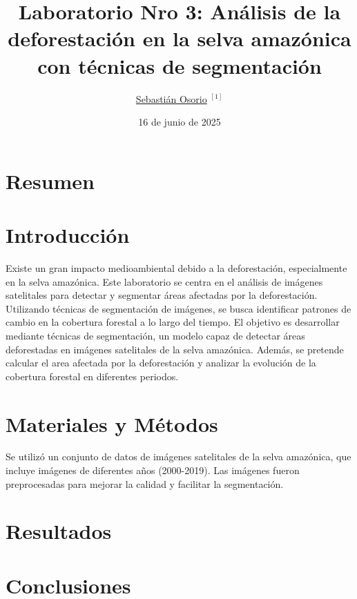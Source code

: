 \documentclass{llncs}
\title{Laboratorio Nro 3: Análisis de la deforestación en la selva amazónica con técnicas de segmentación}
\author{\href{https://orcid.org/0000-0001-9379-4011}{Sebastián  Osorio}  $^{[1]}$}
\affil{Maestrante de Inteligencia Artificial}
\institute{[1] Universidad Internacional de la Rioja (UNIR), España}
\date {16 de junio de 2025}
\begin{document}
\maketitle

\section{Resumen}

\section{Introducción}
Existe un gran impacto medioambiental debido a la deforestación, especialmente en la selva amazónica. Este laboratorio se centra en el análisis de imágenes satelitales para detectar y segmentar áreas afectadas por la deforestación. Utilizando técnicas de segmentación de imágenes, se busca identificar patrones de cambio en la cobertura forestal a lo largo del tiempo.
El objetivo es desarrollar mediante técnicas de segmentación, un modelo capaz de detectar áreas deforestadas en imágenes satelitales de la selva amazónica. Además, se pretende calcular el area afectada por la deforestación y analizar la evolución de la cobertura forestal en diferentes periodos.
\section{Materiales y Métodos}
Se utilizó un conjunto de datos de imágenes satelitales de la selva amazónica, que incluye imágenes de diferentes años (2000-2019). Las imágenes fueron preprocesadas para mejorar la calidad y facilitar la segmentación. 


\section{Resultados}

\section{Conclusiones}



\end{document}
